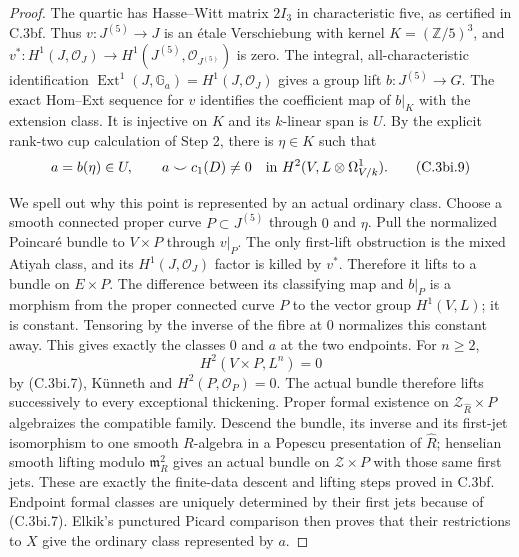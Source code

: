 \begin{proof}
The quartic has Hasse--Witt matrix $2I_3$ in characteristic five, as
certified in C.3bf. Thus $v:J^{(5)}\to J$ is an \'etale
Verschiebung with kernel $K=(\mathbb Z/5)^3$, and
$v^*:H^1(J,\mathcal O_J)\to H^1(J^{(5)},\mathcal O_{J^{(5)}})$
is zero. The integral, all-characteristic identification
$\operatorname{Ext}^1(J,\mathbb G_a)=H^1(J,\mathcal O_J)$
\citep[Section 3.2.3, equation (3.8)]{D_BrionIsogenyII}
gives a group lift $b:J^{(5)}\to G$. The exact Hom--Ext sequence
for $v$ identifies the coefficient map of $b|_K$ with the extension
class. It is injective on $K$ and its $k$-linear span is $U$.
By the explicit rank-two cup calculation of Step 2, there is $\eta\in K$ such that
\[
 a=b(\eta)\in U,\qquad
 a\smile c_1(D)\ne0
 \quad\hbox{in }H^2(V,L\otimes\Omega^1_{V/k}).
 \tag{C.3bi.9}
\]

We spell out why this point is represented by an actual ordinary
class. Choose a smooth connected proper curve $P\subset J^{(5)}$
through $0$ and $\eta$. Pull the normalized Poincar\'e bundle to
$V\times P$ through $v|_P$. The only first-lift obstruction is the
mixed Atiyah class, and its $H^1(J,\mathcal O_J)$ factor is killed by
$v^*$. Therefore it lifts to a bundle on $E\times P$. The difference
between its classifying map and $b|_P$ is a morphism from the proper
connected curve $P$ to the vector group $H^1(V,L)$; it is constant.
Tensoring by the inverse of the fibre at $0$ normalizes this constant
away. This gives exactly the classes $0$ and $a$ at the two endpoints.
For $n\ge2$,
\[
 H^2(V\times P,L^n)=0
\]
by (C.3bi.7), K\"unneth and $H^2(P,\mathcal O_P)=0$. The actual
bundle therefore lifts successively to every exceptional thickening.
Proper formal existence on $\mathcal Z_{\widehat R}\times P$
algebraizes the compatible family. Descend the bundle, its inverse and
its first-jet isomorphism to one smooth $R$-algebra in a Popescu
presentation of $\widehat R$; henselian smooth lifting modulo
$\mathfrak m_R^2$ gives an actual bundle on $\mathcal Z\times P$
with those same first jets. These are exactly the finite-data descent
and lifting steps proved in C.3bf. Endpoint formal classes are uniquely
determined by their first jets because of (C.3bi.7). Elkik's punctured
Picard comparison then proves that their restrictions to $X$ give the
ordinary class represented by $a$.


\end{proof}
